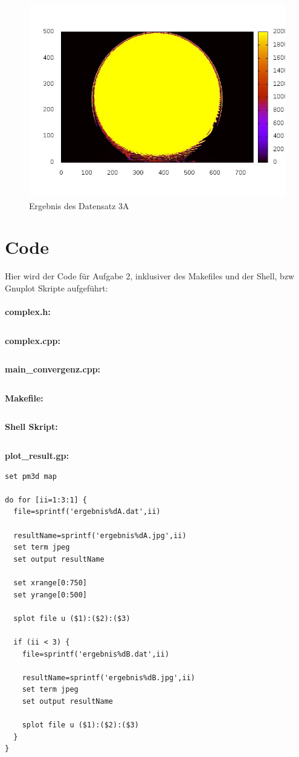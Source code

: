 \documentclass{report}
\begin{document}
\begin{figure}[h]
    \includegraphics[scale=0.7]{ergebnis3A}
    \caption{Ergebnis des Datensatz 3A}
    \label{fig:ergebnis3A} %
\end{figure}


\section{Code}\label{sec:codeA2}

Hier wird der Code für Aufgabe 2, inklusiver des Makefiles und der Shell, bzw Gnuplot Skripte aufgeführt: \\
\\

\textbf{complex.h: }
\inputminted[autogobble]{C++}{complex_a2.h}

\clearpage{}
\textbf{complex.cpp: }
\inputminted[autogobble]{C++}{complex_a2.cpp}

\clearpage{}
\textbf{main\_convergenz.cpp: }
\inputminted[autogobble]{C++}{main_convergenz_a2.cpp}

\clearpage{}
\textbf{Makefile: }
\inputminted[autogobble]{make}{Makefile_a2}

\clearpage{}
\textbf{Shell Skript: }
\inputminted[autogobble]{bash}{run_all_a2.sh}


\clearpage
\textbf{plot\_result.gp: }
\begin{lstlisting}
set pm3d map

do for [ii=1:3:1] {
  file=sprintf('ergebnis%dA.dat',ii)

  resultName=sprintf('ergebnis%dA.jpg',ii)
  set term jpeg
  set output resultName

  set xrange[0:750]
  set yrange[0:500]

  splot file u ($1):($2):($3)

  if (ii < 3) {
    file=sprintf('ergebnis%dB.dat',ii)

    resultName=sprintf('ergebnis%dB.jpg',ii)
    set term jpeg
    set output resultName

    splot file u ($1):($2):($3)
  }
}
\end{lstlisting}
\end{document}
